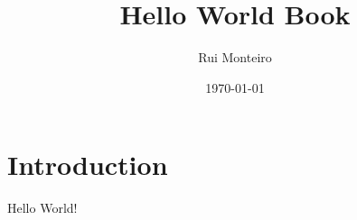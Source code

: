 \documentclass{book}
\title{Hello World Book}
\author{Rui Monteiro}
\date{\today}
\begin{document}
\maketitle

\chapter{Introduction}

Hello World!
\end{document}
